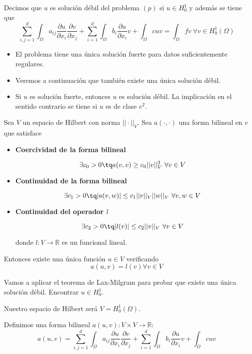 	Decimos que $u$ es solución débil del problema $(p)$ si $u\in H_0^1$ y además se tiene que 
	$$\sum_{i,j=1}^d \int_{\Omega}  a_{ij} \frac{\partial u}{\partial x_i}\frac{\partial v}{\partial x_j} + \sum_{i=1}^d\int_{\Omega} b_i \frac{\partial u}{\partial x_i}v + \int_{\Omega} cuv = \int_{\Omega} f v \ \forall v\in H_0^1(\Omega)$$
	
	\begin{itemize}
		\item El problema tiene una única solución fuerte para datos suficientemente regulares.
		\item Veremos a continuación que también existe una única solución débil.
		\item Si $u$ es solución fuerte, entonces $u$ es solución débil. La implicación en el sentido contrario se tiene si $u$ es de clase $e^2$.
	\end{itemize}
	
	
	\begin{theorem}
		Sea $V$ un espacio de Hilbert con norma $||\cdot||_V$. Sea $a(\cdot, \cdot)$ una forma bilineal en $v$ que satisface
		\begin{itemize}
			\item \textbf{Coercividad de la forma bilineal}
			
			$$\exists c_0 > 0 \tq a(v,v)\ge c_0||v||_V^2 \ \forall v \in V$$
			
			\item \textbf{Continuidad de la forma bilineal}
			
			$$\exists c_1>0 \tq |a(v,w)|\le c_1||v||_V ||w||_V \ \forall v,w\in V$$
			
			\item \textbf{Continuidad del operador $l$}
			
			$$\exists c_2> 0 \tq |l(v)|\le c_2 ||v||_V \ \forall v\in V$$
			
			donde $l:V\longrightarrow \mathbb{R}$ es un funcional lineal.
		\end{itemize}
		
		Entonces existe una única función $u\in V$ verificando
		$$a(u,v) = l(v) \forall v\in V$$
	\end{theorem}
	
	Vamos a aplicar el teorema de Lax-Milgram para probar que existe una única solución débil. Encontrar $u\in H_0^1$.
	
	Nuestro espacio de Hilbert será $V = H_0^1(\Omega)$.
	
	Definimos una forma bilineal $a(u,v): V\times V \longrightarrow \mathbb{R}$:
	$$a(u,v) = \sum_{i,j=1}^d \int_{\Omega} a_{ij}\frac{\partial u}{\partial x_i}\frac{\partial v}{\partial x_j} + \sum_{i=1}^d \int_{\Omega}b_i \frac{\partial u}{\partial x_i}v+ \int_{\Omega} cuv$$
	
